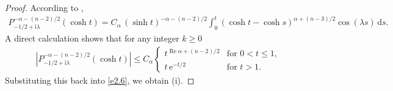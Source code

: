 \documentclass[11pt]{amsproc}
\newcommand{\e}{\mathrm{e}}
\newcommand{\0}{\mathbf{0}}
\renewcommand{\Re}{\mathop{\mathrm{Re}}}
\renewcommand{\i}{\mathrm{i}}
\renewcommand{\d}{\mathrm{d}}
\numberwithin{equation}{section}
\numberwithin{figure}{section}
\theoremstyle{definition}
\theoremstyle{remark}
\numberwithin{thm}{section}
\begin{document}
\begin{proof}
According to \cite[p. 156, (8)]{Er},
\begin{eqnarray*}
P_{-1/2+\i\lambda}^{-\alpha-(n-2)/2}(\cosh t)
=C_\alpha\, (\sinh t)^{-\alpha-(n-2)/2}\int_0^t(\cosh t-\cosh s)^{\alpha+(n-3)/2}\cos (\lambda s)\,\d s.
\end{eqnarray*}
A direct calculation shows that for any integer $k\geq 0$
\begin{eqnarray*}
|P_{-1/2+\i\lambda}^{-\alpha-(n-2)/2}(\cosh t)|\leq C_\alpha \begin{cases}
t^{\Re \alpha+(n-2)/2}&\mbox{for } 0<t\leq 1,\\
t\,\e^{-t/2}&\mbox{for }t>1.
\end{cases}
\end{eqnarray*}
Substituting this back into \eqref{e2.6},   we obtain  (i).


\end{proof}
\end{document}
